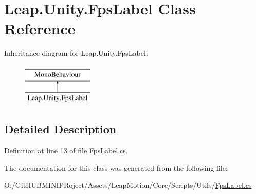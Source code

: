 \hypertarget{class_leap_1_1_unity_1_1_fps_label}{}\section{Leap.\+Unity.\+Fps\+Label Class Reference}
\label{class_leap_1_1_unity_1_1_fps_label}
Inheritance diagram for Leap.\+Unity.\+Fps\+Label\+:\begin{figure}[H]
\begin{center}
\leavevmode
\includegraphics[height=2.000000cm]{class_leap_1_1_unity_1_1_fps_label}
\end{center}
\end{figure}


\subsection{Detailed Description}


Definition at line 13 of file Fps\+Label.\+cs.



The documentation for this class was generated from the following file\+:\begin{DoxyCompactItemize}
\item 
O\+:/\+Git\+H\+U\+B\+M\+I\+N\+I\+P\+Roject/\+Assets/\+Leap\+Motion/\+Core/\+Scripts/\+Utils/\mbox{\hyperlink{_fps_label_8cs}{Fps\+Label.\+cs}}\end{DoxyCompactItemize}
